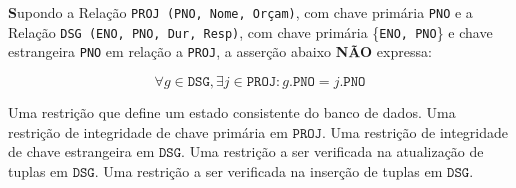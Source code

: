 \documentclass[12pt, addpoints]{exam}
\begin{document}
    \begin{questions}

    \newpage
    \question

\textbf Supondo a Relação \texttt{PROJ (PNO, Nome, Orçam)}, com chave primária \texttt{PNO} e a Relação \texttt{DSG (ENO, PNO, Dur, Resp)}, com chave primária \{\texttt{ENO, PNO}\} e chave estrangeira \texttt{PNO} em relação a \texttt{PROJ}, a asserção abaixo \textbf{NÃO} expressa:



\begin{equation}\forall g \in \texttt{DSG}, \exists j \in \texttt{PROJ} : g.\texttt{PNO} = j.\texttt{PNO}\end{equation}
\begin{choices}
\choice Uma restrição que define um estado consistente do banco de dados.
\choice Uma restrição de integridade de chave primária em $\texttt{PROJ}$.
\choice Uma restrição de integridade de chave estrangeira em $\texttt{DSG}$.
\choice Uma restrição a ser verificada na atualização de tuplas em $\texttt{DSG}$.
\choice Uma restrição a ser verificada na inserção de tuplas em $\texttt{DSG}$.
\end{choices}



    \end{questions}
    
\end{document}
